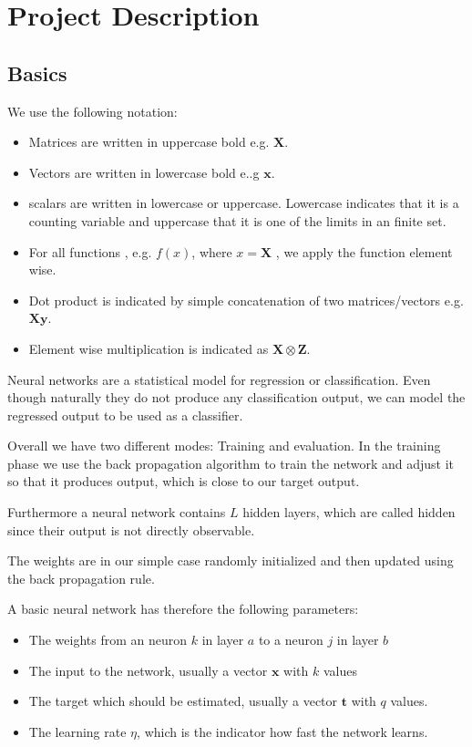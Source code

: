 \chapter{Project Description}

\section{Basics}


We use the following notation:
\begin{itemize}
\item Matrices are written in uppercase bold e.g. $\mathbf{X}$.
\item Vectors are written in lowercase bold e..g $\mathbf{x}$.
\item scalars are written in lowercase or uppercase. Lowercase indicates that it is a counting variable and uppercase that it is one of the limits in an finite set.
\item For all functions , e.g. $f(x)$, where $x = \mathbf{X}$ , we apply the function element wise.
\item Dot product is indicated by simple concatenation of two matrices/vectors e.g. $\mathbf{X} \mathbf{y}$.
\item Element wise multiplication is indicated as $\mathbf{X} \otimes \mathbf{Z}$.
\end{itemize}

Neural networks are a statistical model for regression or classification. Even though naturally they do not produce any classification output, we can model the regressed output to be used as a classifier. 

Overall we have two different modes: Training and evaluation. In the training phase we use the back propagation algorithm to train the network and adjust it so that it produces output, which is close to our target output.

Furthermore a neural network contains $L$ hidden layers, which are called hidden since their output is not directly observable.

The weights are in our simple case randomly initialized and then updated using the back propagation rule.

A basic neural network has therefore the following parameters:
\begin{itemize}
\item The weights from an neuron $k$ in layer $a$ to a neuron $j$ in layer $b$
\item The input to the network, usually a vector $\mathbf{x}$ with $k$ values
\item The target which should be estimated, usually a vector $\mathbf{t}$ with $q$ values.
\item The learning rate $\eta$, which is the indicator how fast the network learns.
\end{itemize}

